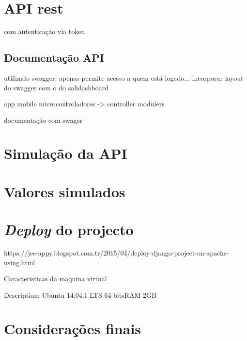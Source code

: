\section{API rest}

com autenticação via token 

\subsection{Documentação API}

utilizado swagger; apenas permite acesso a quem está logado... incorporar layout do swagger com o do salidashboard




app mobile
microcontroladores -> controller modulers 


documentação com swager 





\section{Simulação da API}

\section{Valores simulados}



\section{\textit{Deploy} do projecto}


https://jee-appy.blogspot.com.tr/2015/04/deploy-django-project-on-apache-using.html

Caracteristicas da maquina virtual

Description:	Ubuntu 14.04.1 LTS
64 bitsRAM 2GB 

\section{Considerações finais}








